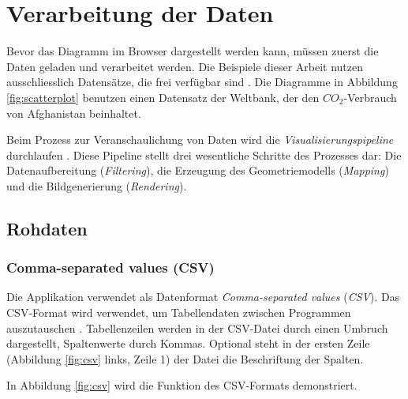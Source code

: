 \section{Verarbeitung der Daten}

Bevor das Diagramm im Browser dargestellt werden kann, müssen zuerst die Daten geladen und verarbeitet werden. Die Beispiele dieser Arbeit nutzen ausschliesslich Datensätze, die frei verfügbar sind \cite{worldbank}.  %
Die Diagramme in Abbildung \ref{fig:scatterplot} benutzen einen Datensatz der Weltbank, der den $CO_2$-Verbrauch von Afghanistan beinhaltet.


Beim Prozess zur Veranschaulichung von Daten wird die \textit{Visualisierungspipeline} durchlaufen \cite[Kapitel 2.1]{viz}. Diese Pipeline stellt drei wesentliche Schritte des Prozesses dar: Die Datenaufbereitung (\textit{Filtering}), die Erzeugung des Geometriemodells (\textit{Mapping}) und die Bildgenerierung (\textit{Rendering}).

\subsection{Rohdaten}

\subsubsection{Comma-separated values (CSV)}

Die Applikation verwendet als Datenformat \textit{Comma-separated values} (\textit{CSV}). Das CSV-Format wird verwendet, um Tabellendaten zwischen Programmen auszutauschen \cite{csv}. Tabellenzeilen werden in der CSV-Datei durch einen Umbruch dargestellt, Spaltenwerte durch Kommas. Optional steht in der ersten Zeile (Abbildung \ref{fig:csv} links, Zeile 1) der Datei die Beschriftung der Spalten.

In Abbildung \ref{fig:csv} wird die Funktion des CSV-Formats demonstriert.

